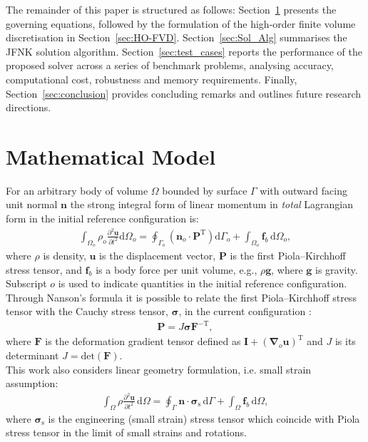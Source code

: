 \documentclass[sn-mathphys,Numbered]{sn-jnl}%
\newcommand{\bb}{\boldsymbol}
\begin{document}
The remainder of this paper is structured as follows: Section~\ref{sec:math_model} presents the governing equations, followed by the formulation of the high-order finite volume discretisation in Section~\ref{sec:HO-FVD}. Section~\ref{sec:Sol_Alg} summarises the JFNK solution algorithm. Section~\ref{sec:test_cases} reports the performance of the proposed solver across a series of benchmark problems, analysing accuracy, computational cost, robustness and memory requirements. Finally, Section~\ref{sec:conclusion} provides concluding remarks and outlines future research directions.
%
%
\section{Mathematical Model}
\label{sec:math_model}
%
%
For an arbitrary body of volume $\Omega$ bounded by surface $\Gamma$ with outward facing unit normal $\bb{n}$
the strong integral form of linear momentum in \emph{total} Lagrangian form  in the initial reference configuration is:
%
\begin{eqnarray} \label{eqn:momentum_TL}
     \int_{\Omega_o} \rho_o \frac{\partial^2 \bb{u} }{\partial t^2} \text{d}\Omega_o
     =
     \oint_{\Gamma_o} \left( \bb{n}_o \cdot  \bb{P}^{\text{T}}\right)  \text{d}\Gamma_o
     + \int_{\Omega_o}  \bb{f}_b \, \text{d}\Omega_o,
\end{eqnarray}
%
where $\rho$ is density, $\bb{u}$ is the displacement vector, $\bb{P}$ is the first Piola–Kirchhoff stress tensor,
and $\bb{f}_b$ is a body force per unit volume, e.g., $\rho \bb{g}$, where $\bb{g}$ is gravity.
Subscript $o$ is used to indicate quantities in the initial reference configuration.
Through Nanson's formula it is possible to relate the first Piola–Kirchhoff stress tensor with the Cauchy stress tensor, $\bb{\sigma}$, in the current configuration \cite{Gurtin1981, Gurtin2010}:
%
\begin{eqnarray} \label{eqn:nanson}
\bb{P}=J \bb{\sigma} \bb{F}^{-\text{T}},
\end{eqnarray}
%
where $\bb{F}$ is the deformation gradient tensor defined as $\bb{I} + (\bb{\nabla}_o \bb{u})^{\text{T}}$ and $J$ is its determinant $J = \text{det}(\bb{F})$.
\\
This work also considers linear geometry formulation, i.e. small strain assumption:
%
\begin{eqnarray} \label{eqn:momentum_lingeom}
    \int_{\Omega} \rho \frac{\partial^2 \bb{u} }{\partial t^2} \, \text{d}\Omega
     =
     \oint_{\Gamma} \bb{n} \cdot \bb{\sigma}_\text{s} \,  \text{d}\Gamma
     + \int_{\Omega}  \bb{f}_b \, \text{d}\Omega,
\end{eqnarray}
%
where $\bb{\sigma}_\text{s}$ is the engineering (small strain) stress tensor which coincide with Piola stress tensor in the limit of small strains and rotations.
\end{document}
